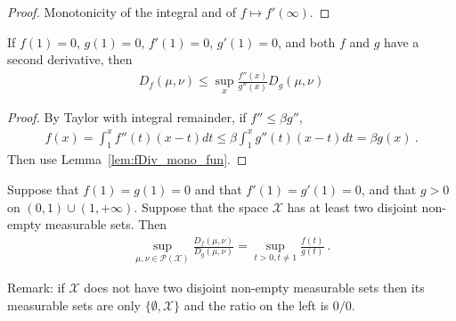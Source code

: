 \begin{proof}
Monotonicity of the integral and of $f \mapsto f'(\infty)$.
\end{proof}


\begin{lemma}
  \label{lem:fDiv_le_of_deriv2_le}
  If $f(1) = 0$, $g(1) = 0$, $f'(1) = 0$, $g'(1) = 0$, and both $f$ and $g$ have a second derivative, then
  \begin{align*}
  D_f(\mu, \nu) \le \sup_x \frac{f''(x)}{g''(x)} D_g(\mu, \nu)
  \end{align*}
\end{lemma}

\begin{proof}%
{}
By Taylor with integral remainder, if $f'' \le \beta g''$,
\begin{align*}
f(x) = \int_1^x f''(t) (x - t) dt
\le \beta \int_1^x g''(t) (x - t) dt
= \beta g(x)
\: .
\end{align*}
Then use Lemma~\ref{lem:fDiv_mono_fun}.
\end{proof}


\begin{theorem}
  \label{thm:fDiv_eq_sup_mul_fDiv}
  Suppose that $f(1) = g(1) = 0$ and that $f'(1) = g'(1) = 0$, and that $g>0$ on $(0,1) \cup (1, +\infty)$. Suppose that the space $\mathcal X$ has at least two disjoint non-empty measurable sets. Then
  \begin{align*}
  \sup_{\mu, \nu \in \mathcal P(\mathcal X)} \frac{D_f(\mu, \nu)}{D_g(\mu, \nu)}
  = \sup_{t > 0, t \ne 1} \frac{f(t)}{g(t)}
  \: .
  \end{align*}
\end{theorem}

Remark: if $\mathcal X$ does not have two disjoint non-empty measurable sets then its measurable sets are only $\{\emptyset, \mathcal X\}$ and the ratio on the left is $0/0$.

